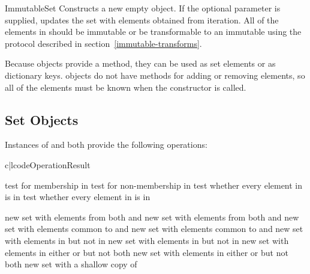 \begin{classdesc}{ImmutableSet}{}
Constructs a new empty  object.  If the optional
 parameter is supplied, updates the set with elements obtained
from iteration.  All of the elements in  should be immutable or
be transformable to an immutable using the protocol described in
section~\ref{immutable-transforms}.

Because  objects provide a  method,
they can be used as set elements or as dictionary keys.  
objects do not have methods for adding or removing elements, so all of the
elements must be known when the constructor is called.
\end{classdesc}


\subsection{Set Objects}

Instances of  and  both provide
the following operations:

\begin{tableii}{c|l}{code}{Operation}{Result}

  \hline
         {test  for membership in }
         {test  for non-membership in }
         {test whether every element in  is in }
         {test whether every element in  is in }

  \hline
         {new set with elements from both  and }
         {new set with elements from both  and }
         {new set with elements common to  and }
         {new set with elements common to  and }
         {new set with elements in  but not in }
         {new set with elements in  but not in }
         {new set with elements in either  or  but not both}
         {new set with elements in either  or  but not both}
         {new set with a shallow copy of }
\end{tableii}

